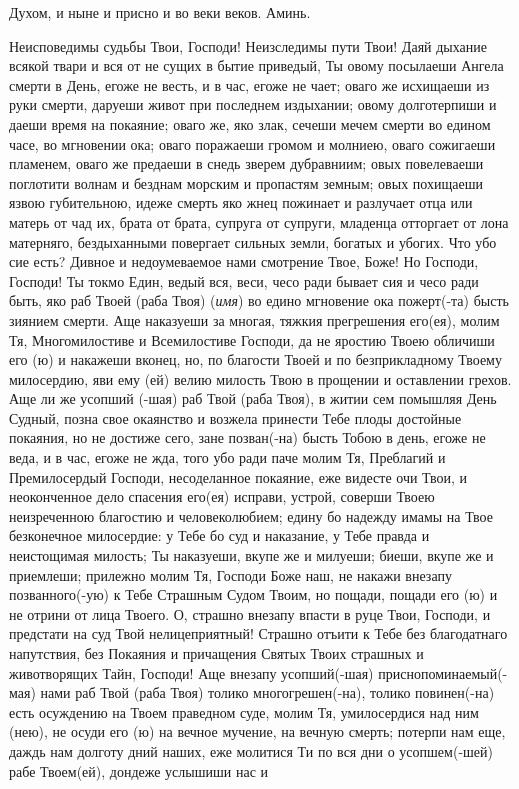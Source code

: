 \begin{mymulticols}
Духом, и ныне и присно и во веки веков. Аминь. 

\end{mymulticols}

\mychapterending[1.5]{}


\begin{mymulticols}
 


Неисповедимы судьбы Твои, Господи! Неизследимы пути Твои! Даяй дыхание всякой твари и вся от не сущих в бытие приведый, Ты овому посылаеши Ангела смерти в День, егоже не весть, и в час, егоже не чает; оваго же исхищаеши из руки смерти, даруеши живот при последнем издыхании; овому долготерпиши и даеши время на покаяние; оваго же, яко злак, сечеши мечем смерти во едином часе, во мгновении ока; оваго поражаеши громом и молниею, оваго сожигаеши пламенем, оваго же предаеши в снедь зверем дубравниим; овых повелеваеши поглотити волнам и безднам морским и пропастям земным; овых похищаеши язвою губительною, идеже смерть яко жнец пожинает и разлучает отца или матерь от чад их, брата от брата, супруга от супруги, младенца отторгает от лона матерняго, бездыханными повергает сильных земли, богатых и убогих. Что убо сие есть? Дивное и недоумеваемое нами смотрение Твое, Боже! Но Господи, Господи! Ты токмо Един, ведый вся, веси, чесо ради бывает сия и чесо ради быть, яко раб Твоей (раба Твоя) ({\itshape имя}) во едино мгновение ока пожерт(-та) бысть зиянием смерти. Аще наказуеши за многая, тяжкия прегрешения его(ея), молим Тя, Многомилостиве и Всемилостиве Господи, да не яростию Твоею обличиши его (ю) и накажеши вконец, но, по благости Твоей и по безприкладному Твоему милосердию, яви ему (ей) велию милость Твою в прощении и оставлении грехов. Аще ли же усопший (-шая) раб Твой (раба Твоя), в житии сем помышляя День Судный, позна свое окаянство и возжела принести Тебе плоды достойные покаяния, но не достиже сего, зане позван(-на) бысть Тобою в день, егоже не веда, и в час, егоже не жда, того убо ради паче молим Тя, Преблагий и Премилосердый Господи, несоделанное покаяние, еже видесте очи Твои, и неоконченное дело спасения его(ея) исправи, устрой, соверши Твоею неизреченною благостию и человеколюбием; едину бо надежду имамы на Твое безконечное милосердие: у Тебе бо суд и наказание, у Тебе правда и неистощимая милость; Ты наказуеши, вкупе же и милуеши; биеши, вкупе же и приемлеши; прилежно молим Тя, Господи Боже наш, не накажи внезапу позванного(-ую) к Тебе Страшным Судом Твоим, но пощади, пощади его (ю) и не отрини от лица Твоего. О, страшно внезапу впасти в руце Твои, Господи, и предстати на суд Твой нелицеприятный! Страшно отъити к Тебе без благодатнаго напутствия, без Покаяния и причащения Святых Твоих страшных и животворящих Тайн, Господи! Аще внезапу усопший(-шая) приснопоминаемый(-мая) нами раб Твой (раба Твоя) толико многогрешен(-на), толико повинен(-на) есть осуждению на Твоем праведном суде, молим Тя, умилосердися над ним (нею), не осуди его (ю) на вечное мучение, на вечную смерть; потерпи нам еще, даждь нам долготу дний наших, еже молитися Ти по вся дни о усопшем(-шей) рабе Твоем(ей), дондеже услышиши нас и 
\end{mymulticols}
